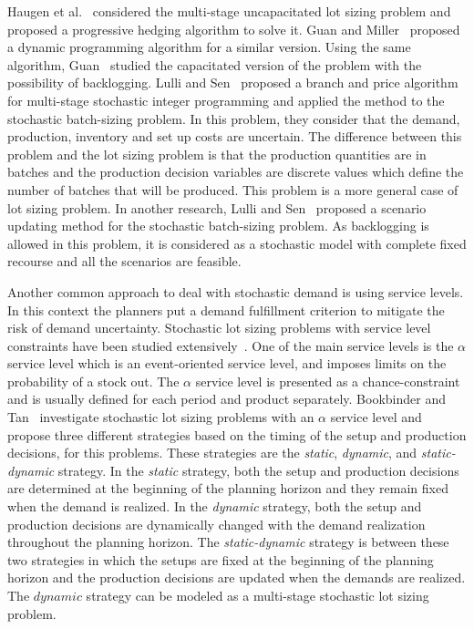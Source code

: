 \documentclass[10pt]{article}
\begin{document}
 Haugen et al.~\cite{haugen2001progressive} considered the multi-stage uncapacitated lot sizing problem and proposed a progressive hedging algorithm to solve it. Guan and Miller~\cite{guan2008polynomial} proposed a dynamic programming algorithm for a similar version. Using the same algorithm, Guan~\cite{guan2011stochastic} studied the capacitated version of the problem with the possibility of backlogging. Lulli and Sen~\cite{lulli2004branch} proposed a branch and price algorithm for multi-stage stochastic integer programming and applied the method to the stochastic batch-sizing problem. In this problem, they consider that the demand, production, inventory and set up costs are uncertain. The difference between this problem and the lot sizing problem is that the production quantities are in batches and the production decision variables are discrete values which define the number of batches that will be produced. This problem is a more general case of lot sizing problem. In another research, Lulli and Sen~\cite{lulli2004branch}  proposed a scenario updating method for the stochastic batch-sizing problem. As backlogging is allowed in this problem, it is considered as a stochastic model with complete fixed recourse and all the scenarios are feasible.  

Another common approach to deal with stochastic demand is using service levels. In this context the planners put  a demand fulfillment criterion to mitigate the risk of demand uncertainty. Stochastic lot sizing problems with service level constraints have been studied extensively~\cite{tempelmeier2007stochastic}. One of the main service levels is the $\alpha$ service level which is an event-oriented service level, and imposes limits on the probability of a stock out. The $\alpha$ service level is presented as a chance-constraint and is usually defined for each period and product separately. Bookbinder and Tan~\cite{bookbinder1988strategies} investigate stochastic lot sizing problems with an $\alpha$ service level and propose three different strategies based on the timing of the setup and production decisions, for this problems. These strategies are the \textit{static}, \textit{dynamic}, and \textit{static-dynamic} strategy. In the \textit{static} strategy, both the setup and production decisions are determined at the beginning of the planning horizon and they remain fixed when the demand is realized. In the \textit{dynamic} strategy, both the setup and production decisions are dynamically changed with the demand realization throughout the planning horizon. The \textit{static-dynamic} strategy is between these two strategies in which the setups are fixed at the beginning of the planning horizon and the production decisions are updated when the demands are realized. The $dynamic$ strategy can be modeled as a multi-stage stochastic lot sizing problem.  
\end{document}
